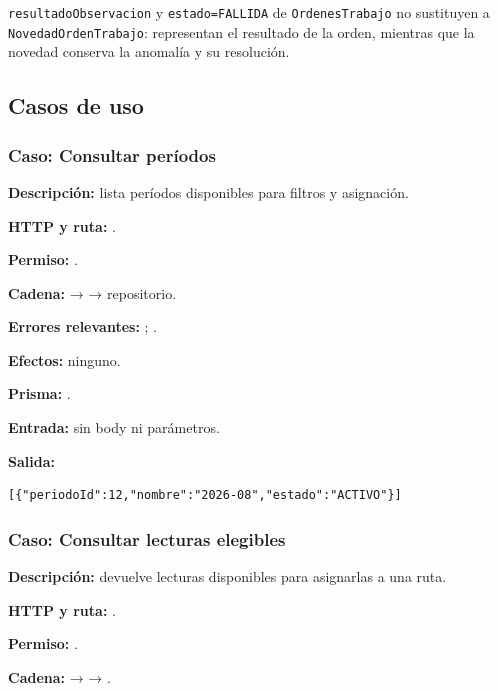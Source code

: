 \texttt{resultadoObservacion} y \texttt{estado=FALLIDA} de \texttt{OrdenesTrabajo} no sustituyen a \texttt{NovedadOrdenTrabajo}: representan el resultado de la orden, mientras que la novedad conserva la anomalía y su resolución.


\subsection{Casos de uso}


\subsubsection{Caso: Consultar períodos}


\textbf{Descripción:} lista períodos disponibles para filtros y asignación.  

\textbf{HTTP y ruta:} \texttt{}.  

\textbf{Permiso:} \texttt{}.  

\textbf{Cadena:} \texttt{} → \texttt{} → repositorio.  

\textbf{Errores relevantes:} \texttt{}; \texttt{}.  

\textbf{Efectos:} ninguno.  

\textbf{Prisma:} \texttt{}.  

\textbf{Entrada:} sin body ni parámetros.  

\textbf{Salida:}


\begin{lstlisting}
[{"periodoId":12,"nombre":"2026-08","estado":"ACTIVO"}]
\end{lstlisting}


\subsubsection{Caso: Consultar lecturas elegibles}


\textbf{Descripción:} devuelve lecturas disponibles para asignarlas a una ruta.  

\textbf{HTTP y ruta:} \texttt{}.  

\textbf{Permiso:} \texttt{}.  

\textbf{Cadena:} \texttt{} → \texttt{} → \texttt{}.  

